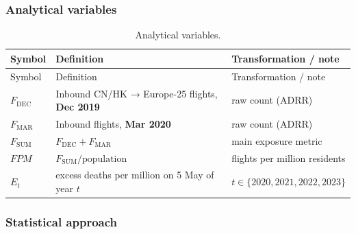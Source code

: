 \documentclass[
  authoryear,
  preprint,
  3p,
  onecolumn]{elsarticle}
\begin{document}
\clearpage

\subsubsection{Analytical variables}\label{analytical-variables}

\begin{longtable}[]{@{}
  >{\raggedright\arraybackslash}p{}
  >{\raggedright\arraybackslash}p{}
  >{\raggedright\arraybackslash}p{}@{}}
\caption{Analytical variables.}\label{tbl-vars}\tabularnewline
\toprule\noalign{}
\begin{minipage}[b]{\linewidth}\raggedright
Symbol
\end{minipage} & \begin{minipage}[b]{\linewidth}\raggedright
Definition
\end{minipage} & \begin{minipage}[b]{\linewidth}\raggedright
Transformation / note
\end{minipage} \\
\midrule\noalign{}
\endfirsthead
\toprule\noalign{}
\begin{minipage}[b]{\linewidth}\raggedright
Symbol
\end{minipage} & \begin{minipage}[b]{\linewidth}\raggedright
Definition
\end{minipage} & \begin{minipage}[b]{\linewidth}\raggedright
Transformation / note
\end{minipage} \\
\midrule\noalign{}
\endhead
\bottomrule\noalign{}
\endlastfoot
\(F_{\text{DEC}}\) & Inbound CN/HK → Europe-25 flights, \textbf{Dec
2019} & raw count (ADRR) \\
\(F_{\text{MAR}}\) & Inbound flights, \textbf{Mar 2020} & raw count
(ADRR) \\
\(F_{\text{SUM}}\) & \(F_{\text{DEC}} + F_{\text{MAR}}\) & main exposure
metric \\
\(FPM\) & \(F_{\text{SUM}} / \text{population}\) & flights per million
residents \\
\(E_t\) & excess deaths per million on 5 May of year \(t\) &
\(t \in \{2020, 2021, 2022, 2023\}\) \\
\end{longtable}

\subsubsection{Statistical approach}\label{statistical-approach}
\end{document}
